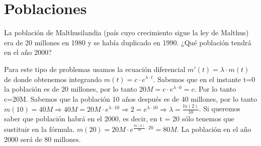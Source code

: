 
\section{Poblaciones}
\begin{ejer}
	La población de Malthusilandia (país cuyo crecimiento sigue la ley de Malthus) era de 20 millones en 1980 y se había duplicado en 1990. ¿Qué población tendrá en el año 2000?
\end{ejer}
\begin{sol}
	Para este tipo de problemas usamos la ecuación diferencial $m'(t) = \lambda \cdot m(t)$ de donde obtenemos integrando $m(t) = c\cdot e^{\lambda \cdot t}$.  
	Sabemos que en el instante t=0 la población es de 20 millones, por lo tanto $20M = c\cdot e^{\lambda \cdot 0} = c$. Por lo tanto c=20M.  
	Sabemos que la población 10 años después es de 40 millones, por lo tanto $m(10) = 40M \Rightarrow 40M = 20M \cdot e^{\lambda \cdot 10} \Rightarrow 2 = e^{\lambda \cdot 10} \Rightarrow \lambda = \frac{ln(2)}{10}$.  
	Si queremos saber que población habrá en el 2000, es decir, en t = 20 sólo tenemos que sustituir en la fórmula.  
	$m(20) = 20M\cdot e^{\frac{ln(2)}{10}\cdot 20} = 80M$.  
	La población en el año 2000 será de 80 millones.
\end{sol}

